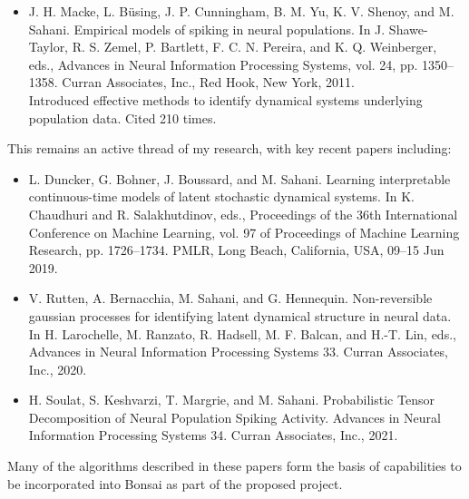 {\begin{itemize}[topsep=0pt,itemsep=0pt]
\item J. H. Macke, L. Büsing, J. P. Cunningham, B. M. Yu, K. V. Shenoy, and M. Sahani.
Empirical models of spiking in neural populations.
In J. Shawe-Taylor, R. S. Zemel, P. Bartlett, F. C. N. Pereira, and
K. Q. Weinberger, eds., Advances in Neural Information Processing
Systems, vol. 24, pp. 1350–1358. Curran Associates, Inc., Red Hook,
New York, 2011.\\
Introduced effective methods to identify dynamical systems underlying
population data.  Cited 210 times.
\end{itemize}
\noindent This remains an active thread of my research, with key recent
papers including:
\begin{itemize}[topsep=0pt,itemsep=0pt]
% 

\item L. Duncker, G. Bohner, J. Boussard, and M. Sahani.
Learning interpretable continuous-time models of latent stochastic dynamical systems.
In K. Chaudhuri and R. Salakhutdinov, eds., Proceedings of the 36th International Conference on Machine Learning, vol. 97 of Proceedings of Machine Learning Research, pp. 1726–1734. PMLR, Long Beach, California, USA, 09–15 Jun 2019. 
\item V. Rutten, A. Bernacchia, M. Sahani, and G. Hennequin.
Non-reversible gaussian processes for identifying latent dynamical structure in neural data.
In H. Larochelle, M. Ranzato, R. Hadsell, M. F. Balcan, and H.-T. Lin,
eds., Advances in Neural Information Processing Systems 33. Curran
Associates, Inc., 2020.
\item H. Soulat, S. Keshvarzi,  T. Margrie, and M. Sahani.
  Probabilistic Tensor Decomposition of Neural Population Spiking
  Activity.
  Advances in Neural Information Processing Systems 34. Curran
  Associates, Inc., 2021.
\end{itemize}
Many of the algorithms described in these papers form the basis of
capabilities to be incorporated into Bonsai as part of the proposed
project.


}
